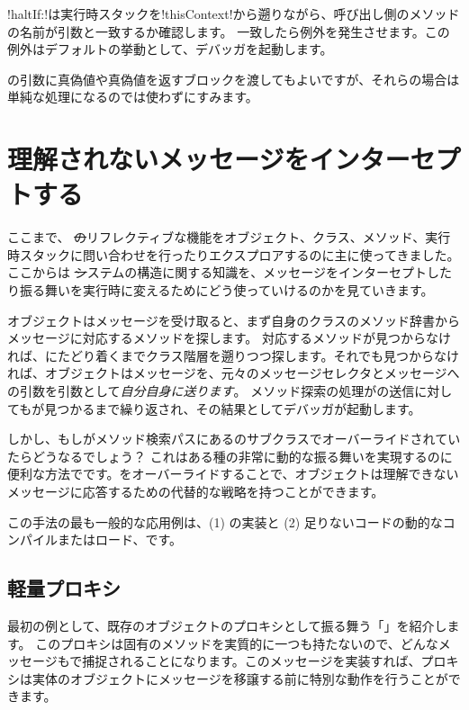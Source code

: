 \documentclass[a4paper,10pt,twoside]{book}
\begin{document}
\ct!haltIf:!は実行時スタックを\ct!thisContext!から遡りながら、呼び出し側のメソッドの名前が引数と一致するか確認します。
一致したら例外を発生させます。この例外はデフォルトの挙動として、デバッガを起動します。

の引数に真偽値や真偽値を返すブロックを渡してもよいですが、それらの場合は単純な処理になるのでは使わずにすみます。

\section{理解されないメッセージをインターセプトする}

ここまで、 \st のリフレクティブな機能をオブジェクト、クラス、メソッド、実行時スタックに問い合わせを行ったりエクスプロアするのに主に使ってきました。ここからは \st システムの構造に関する知識を、メッセージをインターセプトしたり振る舞いを実行時に変えるためにどう使っていけるのかを見ていきます。

オブジェクトはメッセージを受け取ると、まず自身のクラスのメソッド辞書からメッセージに対応するメソッドを探します。
対応するメソッドが見つからなければ、にたどり着くまでクラス階層を遡りつつ探します。それでも見つからなければ、オブジェクトはメッセージを、元々のメッセージセレクタとメッセージへの引数を引数として\emph{自分自身に送ります}。
メソッド探索の処理がの送信に対してもが見つかるまで繰り返され、その結果としてデバッガが起動します。

しかし、もしがメソッド検索パスにあるのサブクラスでオーバーライドされていたらどうなるでしょう？
これはある種の非常に動的な振る舞いを実現するのに便利な方法でです。をオーバーライドすることで、オブジェクトは理解できないメッセージに応答するための代替的な戦略を持つことができます。

この手法の最も一般的な応用例は、(1) の実装と (2) 足りないコードの動的なコンパイルまたはロード、です。

\subsection{軽量プロキシ}

最初の例として、既存のオブジェクトのプロキシとして振る舞う「」を紹介します。
このプロキシは固有のメソッドを実質的に一つも持たないので、どんなメッセージもで捕捉されることになります。このメッセージを実装すれば、プロキシは実体のオブジェクトにメッセージを移譲する前に特別な動作を行うことができます。
\end{document}

